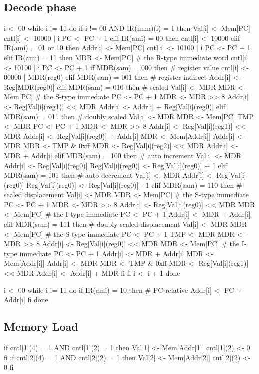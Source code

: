 \documentclass[12pt]{article}
\begin{document}
\subsection{Decode phase}
\begin{verbatimtab}
i <- 00
while i != 11 do
	if i != 00 AND IR(imm)(i) = 1 then
		Val[i] <- Mem[PC]
		cntl[i] <- 10000 | i
		PC <- PC + 1
	elif IR(ami) = 00 then
		cntl[i] <- 10000
	elif IR(ami) = 01 or 10 then
		Addr[i] <- Mem[PC]
		cntl[i] <- 10100 | i
		PC <- PC + 1
	elif IR(ami) = 11 then
		MDR <- Mem[PC] # the R-type immediate word
		cntl[i] <- 10100 | i
		PC <- PC + 1
		if MDR(sam) = 000 then # register value
			cntl[i] <- 00000 | MDR(reg0)
		elif MDR(sam) = 001 then # register indirect
			Addr[i] <- Reg[MDR(reg0)]
		elif MDR(sam) = 010 then # scaled
			Val[i] <- MDR
			MDR <- Mem[PC] # the S-type immediate
			PC <- PC + 1
			MDR <- MDR >> 8
			Addr[i] <- Reg[Val[i](reg1)] << MDR
			Addr[i] <- Addr[i] + Reg[Val[i](reg0)]
		elif MDR(sam) = 011 then # doubly scaled
			Val[i] <- MDR
			MDR <- Mem[PC]
			TMP <- MDR
			PC <- PC + 1
			MDR <- MDR >> 8
			Addr[i] <- Reg[Val[i](reg1)] << MDR
			Addr[i] <- Reg[Val[i](reg0)] + Addr[i]
			MDR <- Mem[Addr[i]]
			Addr[i] <- MDR
			MDR <- TMP & 0xff
			MDR <- Reg[Val[i](reg2)] << MDR
			Addr[i] <- MDR + Addr[i]
		elif MDR(sam) = 100 then # auto increment
			Val[i] <- MDR
			Addr[i] <- Reg[Val[i](reg0)]
			Reg[Val[i](reg0)] <- Reg[Val[i](reg0)] + 1
		elif MDR(sam) = 101 then # auto decrement
			Val[i] <- MDR
			Addr[i] <- Reg[Val[i](reg0)]
			Reg[Val[i](reg0)] <- Reg[Val[i](reg0)] - 1
		elif MDR(sam) = 110 then # scaled displacement
			Val[i] <- MDR
			MDR <- Mem[PC] # the S-type immediate
			PC <- PC + 1
			MDR <- MDR >> 8
			Addr[i] <- Reg[Val[i](reg0)] << MDR
			MDR <- Mem[PC] # the I-type immediate
			PC <- PC + 1
			Addr[i] <- MDR + Addr[i]
		elif MDR(sam) = 111 then # doubly scaled displacement
			Val[i] <- MDR
			MDR <- Mem[PC] # the S-type immediate
			PC <- PC + 1
			TMP <- MDR
			MDR <- MDR >> 8
			Addr[i] <- Reg[Val[i](reg0)] << MDR
			MDR <- Mem[PC] # the I-type immediate
			PC <- PC + 1
			Addr[i] <- MDR + Addr[i]
			MDR <- Mem[Addr[i]]
			Addr[i] <- MDR
			MDR <- TMP & 0xff
			MDR <- Reg[Val[i](reg1)] << MDR
			Addr[i] <- Addr[i] + MDR
		fi
	fi
	i <- i + 1
done

i <- 00
while i != 11 do
	if IR(ami) = 10 then # PC-relative
		Addr[i] <- PC + Addr[i]
	fi
done
\end{verbatimtab}

\subsection{Memory Load}
\begin{verbatimtab}
if cntl[1](4) = 1 AND cntl[1](2) = 1 then
	Val[1] <- Mem[Addr[1]]
	cntl[1](2) <- 0
fi
if cntl[2](4) = 1 AND cntl[2](2) = 1 then
	Val[2] <- Mem[Addr[2]]
	cntl[2](2) <- 0
fi
\end{verbatimtab}
\end{document}
